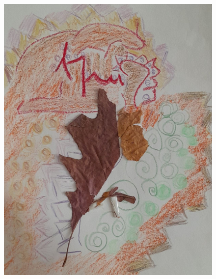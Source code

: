 \documentclass[12pt, a4paper, twoside]{book} %
\begin{document}
\begin{figure}[H]
	\centering
	\includegraphics[width=\textwidth]{./images/1f81324df11e90.jpg}
\end{figure}
\end{document}

